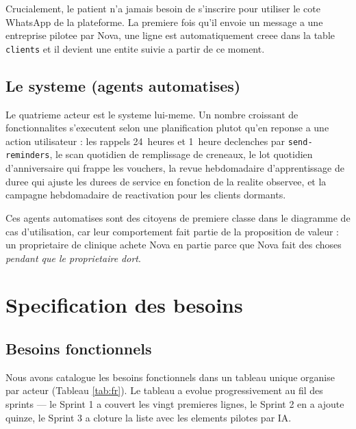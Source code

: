 Crucialement, le patient n'a jamais besoin de s'inscrire pour utiliser
le cote WhatsApp de la plateforme. La premiere fois qu'il envoie un
message a une entreprise pilotee par Nova, une ligne est automatiquement
creee dans la table \texttt{clients} et il devient une entite suivie a
partir de ce moment.

\subsection{Le systeme (agents automatises)}
Le quatrieme acteur est le systeme lui-meme. Un nombre croissant de
fonctionnalites s'executent selon une planification plutot qu'en reponse
a une action utilisateur : les rappels 24~heures et 1~heure declenches
par \texttt{send-reminders}, le scan quotidien de remplissage de
creneaux, le lot quotidien d'anniversaire qui frappe les vouchers, la
revue hebdomadaire d'apprentissage de duree qui ajuste les durees de
service en fonction de la realite observee, et la campagne hebdomadaire
de reactivation pour les clients dormants.

Ces agents automatises sont des citoyens de premiere classe dans le
diagramme de cas d'utilisation, car leur comportement fait partie de la
proposition de valeur : un proprietaire de clinique achete Nova en
partie parce que Nova fait des choses \emph{pendant que le proprietaire
dort}.

\section{Specification des besoins}

\subsection{Besoins fonctionnels}
Nous avons catalogue les besoins fonctionnels dans un tableau unique
organise par acteur (Tableau \ref{tab:fr}). Le tableau a evolue
progressivement au fil des sprints --- le Sprint 1 a couvert les vingt
premieres lignes, le Sprint 2 en a ajoute quinze, le Sprint 3 a cloture
la liste avec les elements pilotes par IA.

